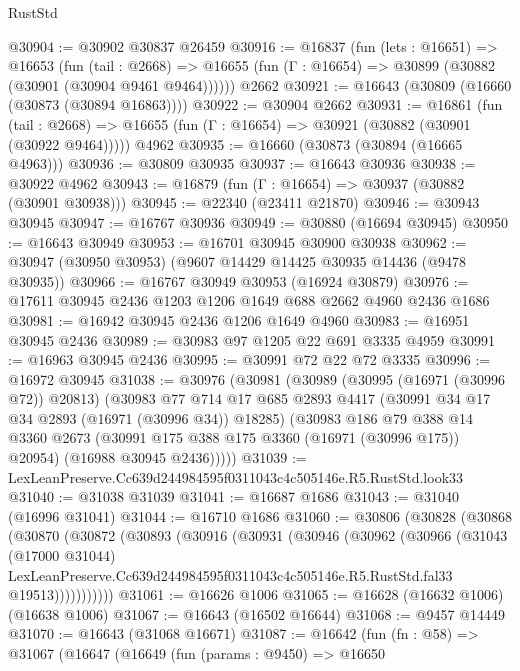 \begin{lexlean}{RustStd}
\begin{coremodule}
@30904 := @30902 @30837 @26459
@30916 := @16837
    (fun (lets : @16651) =>
    @16653
      (fun (tail : @2668) =>
      @16655 (fun (Γ : @16654) => @30899 (@30882 (@30901 (@30904 @9461 @9464))))))
    @2662
@30921 := @16643 (@30809 (@16660 (@30873 (@30894 @16863))))
@30922 := @30904 @2662
@30931 := @16861
    (fun (tail : @2668) => @16655 (fun (Γ : @16654) => @30921 (@30882 (@30901 (@30922 @9464)))))
    @4962
@30935 := @16660 (@30873 (@30894 (@16665 @4963)))
@30936 := @30809 @30935
@30937 := @16643 @30936
@30938 := @30922 @4962
@30943 := @16879 (fun (Γ : @16654) => @30937 (@30882 (@30901 @30938)))
@30945 := @22340 (@23411 @21870)
@30946 := @30943 @30945
@30947 := @16767 @30936
@30949 := @30880 (@16694 @30945)
@30950 := @16643 @30949
@30953 := @16701 @30945 @30900 @30938
@30962 := @30947 (@30950 @30953) (@9607 @14429 @14425 @30935 @14436 (@9478 @30935))
@30966 := @16767 @30949 @30953 (@16924 @30879)
@30976 := @17611 @30945 @2436 @1203 @1206 @1649 @688 @2662 @4960 @2436 @1686
@30981 := @16942 @30945 @2436 @1206 @1649 @4960
@30983 := @16951 @30945 @2436
@30989 := @30983 @97 @1205 @22 @691 @3335 @4959
@30991 := @16963 @30945 @2436
@30995 := @30991 @72 @22 @72 @3335
@30996 := @16972 @30945
@31038 := @30976
    (@30981
      (@30989
        (@30995 (@16971 (@30996 @72)) @20813)
        (@30983
          @77
          @714
          @17
          @685
          @2893
          @4417
          (@30991 @34 @17 @34 @2893 (@16971 (@30996 @34)) @18285)
          (@30983
            @186
            @79
            @388
            @14
            @3360
            @2673
            (@30991 @175 @388 @175 @3360 (@16971 (@30996 @175)) @20954)
            (@16988 @30945 @2436)))))
@31039 := LexLeanPreserve.Cc639d244984595f0311043c4c505146e.R5.RustStd.look33
@31040 := @31038 @31039
@31041 := @16687 @1686
@31043 := @31040 (@16996 @31041)
@31044 := @16710 @1686
@31060 := @30806
    (@30828
      (@30868
        (@30870
          (@30872
            (@30893
              (@30916
                (@30931
                  (@30946
                    (@30962
                      (@30966
                        (@31043
                          (@17000 @31044)
                          LexLeanPreserve.Cc639d244984595f0311043c4c505146e.R5.RustStd.fal33
                          @19513)))))))))))
@31061 := @16626 @1006
@31065 := @16628 (@16632 @1006) (@16638 @1006)
@31067 := @16643 (@16502 @16644)
@31068 := @9457 @14449
@31070 := @16643 (@31068 @16671)
@31087 := @16642
    (fun (fn : @58) =>
    @31067
      (@16647
        (@16649
          (fun (params : @9450) =>
          @16650

\end{coremodule}
\end{lexlean}
